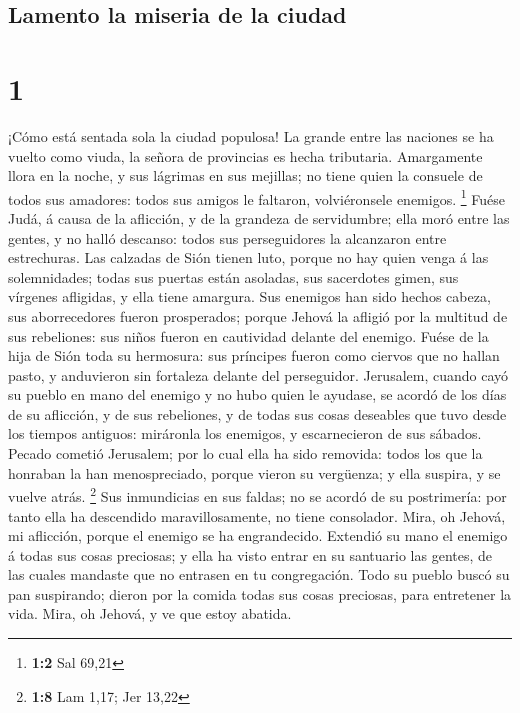 \hypertarget{lamento-la-miseria-de-la-ciudad}{%
\subsection{Lamento la miseria de la
ciudad}\label{lamento-la-miseria-de-la-ciudad}}

\hypertarget{section}{%
\section{1}\label{section}}

 ¡Cómo está sentada sola la ciudad populosa! La grande
entre las naciones se ha vuelto como viuda, la señora de provincias es
hecha tributaria.  Amargamente llora en la noche, y sus
lágrimas en sus mejillas; no tiene quien la consuele de todos sus
amadores: todos sus amigos le faltaron, volviéronsele enemigos.
\footnote{\textbf{1:2} Sal 69,21}  Fuése Judá, á causa de
la aflicción, y de la grandeza de servidumbre; ella moró entre las
gentes, y no halló descanso: todos sus perseguidores la alcanzaron entre
estrechuras.  Las calzadas de Sión tienen luto, porque no
hay quien venga á las solemnidades; todas sus puertas están asoladas,
sus sacerdotes gimen, sus vírgenes afligidas, y ella tiene amargura.
 Sus enemigos han sido hechos cabeza, sus aborrecedores
fueron prosperados; porque Jehová la afligió por la multitud de sus
rebeliones: sus niños fueron en cautividad delante del enemigo.
 Fuése de la hija de Sión toda su hermosura: sus príncipes
fueron como ciervos que no hallan pasto, y anduvieron sin fortaleza
delante del perseguidor.  Jerusalem, cuando cayó su pueblo
en mano del enemigo y no hubo quien le ayudase, se acordó de los días de
su aflicción, y de sus rebeliones, y de todas sus cosas deseables que
tuvo desde los tiempos antiguos: miráronla los enemigos, y escarnecieron
de sus sábados.  Pecado cometió Jerusalem; por lo cual
ella ha sido removida: todos los que la honraban la han menospreciado,
porque vieron su vergüenza; y ella suspira, y se vuelve atrás.
\footnote{\textbf{1:8} Lam 1,17; Jer 13,22}  Sus
inmundicias en sus faldas; no se acordó de su postrimería: por tanto
ella ha descendido maravillosamente, no tiene consolador. Mira, oh
Jehová, mi aflicción, porque el enemigo se ha engrandecido.
 Extendió su mano el enemigo á todas sus cosas preciosas;
y ella ha visto entrar en su santuario las gentes, de las cuales
mandaste que no entrasen en tu congregación.  Todo su
pueblo buscó su pan suspirando; dieron por la comida todas sus cosas
preciosas, para entretener la vida. Mira, oh Jehová, y ve que estoy
abatida.

